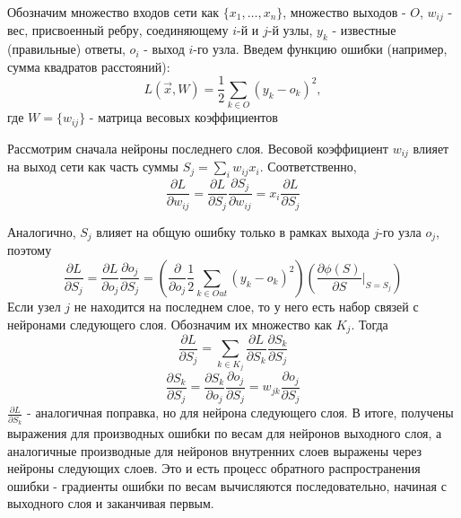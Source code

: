 		Обозначим множество входов сети как $\{x_1, \ldots, x_n\}$, множество выходов - $O$, $w_{ij}$ - вес, присвоенный ребру, соединяющему $i$-й и $j$-й узлы, $y_k$ - известные (правильные) ответы, $o_i$ - выход $i$-го узла. Введем функцию ошибки (например, сумма квадратов расстояний):
		$$ L(\vec{x}, W) = \frac{1}{2} \sum_{k \in O} (y_k - o_k)^2, $$
		где $W = \{w_{ij}\}$ - матрица весовых коэффициентов
		
		Рассмотрим сначала нейроны последнего слоя. Весовой коэффициент $w_{ij}$ влияет на выход сети как часть суммы $S_j = \sum_i w_{ij} x_i$. Соответственно,
		$$ \frac{\partial L}{\partial w_{ij}} = \frac{\partial L}{\partial S_j} \frac{\partial S_j}{\partial w_{ij}} = x_i \frac{\partial L}{\partial S_j} $$
		
		Аналогично, $S_j$ влияет на общую ошибку только в рамках выхода $j$-го узла $o_j$, поэтому
		$$ \frac{\partial L}{\partial S_j} = \frac{\partial L}{\partial o_j} \frac{\partial o_j}{\partial S_j}  = (\frac{\partial}{\partial o_j} \frac{1}{2} \sum_{k \in Out} (y_k - o_k)^2)(\frac{\partial \phi(S)}{\partial S} \bigg|_{S = S_j})$$
		Если узел $j$ не находится на последнем слое, то у него есть набор связей с нейронами следующего слоя. Обозначим их множество как $K_j$. Тогда
		$$ \frac{\partial L}{\partial S_j} = \sum_{k \in K_j} \frac{\partial L}{\partial S_k} \frac{\partial S_k}{\partial S_j} $$
		$$ \frac{\partial S_k}{\partial S_j} = \frac{\partial S_k}{\partial o_j} \frac{\partial o_j}{\partial S_j} = w_{jk}\frac{\partial o_j}{\partial S_j} $$
		$ \frac{\partial L}{\partial S_k}$ - аналогичная поправка, но для нейрона следующего слоя. В итоге, получены выражения для производных ошибки по весам для нейронов выходного слоя, а аналогичные производные для нейронов внутренних слоев выражены через нейроны следующих слоев. Это и есть процесс обратного распространения ошибки - градиенты ошибки по весам вычисляются последовательно, начиная с выходного слоя и заканчивая первым.
		